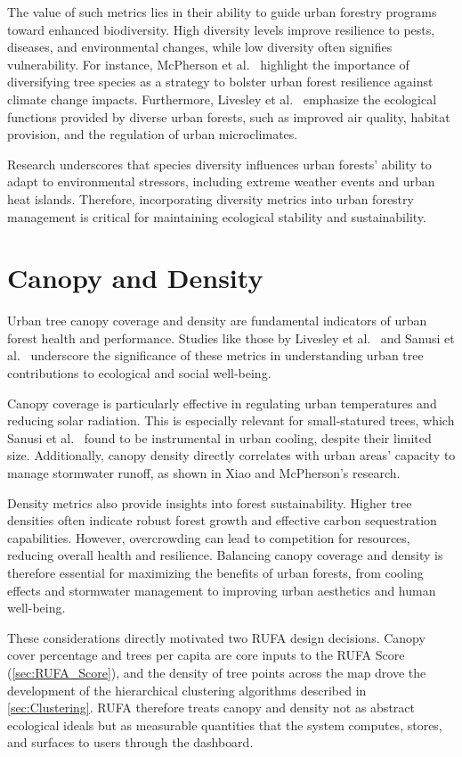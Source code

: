 The value of such metrics lies in their ability to guide urban forestry programs toward enhanced biodiversity. High diversity levels improve resilience to pests, diseases, and environmental changes, while low diversity often signifies vulnerability. For instance, McPherson et al.\ \cite{mcpherson2018} highlight the importance of diversifying tree species as a strategy to bolster urban forest resilience against climate change impacts. Furthermore, Livesley et al.\ \cite{livesley2016} emphasize the ecological functions provided by diverse urban forests, such as improved air quality, habitat provision, and the regulation of urban microclimates.

Research underscores that species diversity influences urban forests' ability to adapt to environmental stressors, including extreme weather events and urban heat islands. Therefore, incorporating diversity metrics into urban forestry management is critical for maintaining ecological stability and sustainability.

\section{Canopy and Density} \label{sec:Canopy_Density}

Urban tree canopy coverage and density are fundamental indicators of urban forest health and performance. Studies like those by Livesley et al.\ \cite{livesley2016} and Sanusi et al.\ \cite{sanusi2016} underscore the significance of these metrics in understanding urban tree contributions to ecological and social well-being.

Canopy coverage is particularly effective in regulating urban temperatures and reducing solar radiation. This is especially relevant for small-statured trees, which Sanusi et al.\ \cite{sanusi2016} found to be instrumental in urban cooling, despite their limited size. Additionally, canopy density directly correlates with urban areas' capacity to manage stormwater runoff, as shown in Xiao and McPherson's \cite{xiao2016} research.

Density metrics also provide insights into forest sustainability. Higher tree densities often indicate robust forest growth and effective carbon sequestration capabilities. However, overcrowding can lead to competition for resources, reducing overall health and resilience. Balancing canopy coverage and density is therefore essential for maximizing the benefits of urban forests, from cooling effects and stormwater management to improving urban aesthetics and human well-being.

These considerations directly motivated two RUFA design decisions. Canopy cover percentage and trees per capita are core inputs to the RUFA Score (\autoref{sec:RUFA_Score}), and the density of tree points across the map drove the development of the hierarchical clustering algorithms described in \autoref{sec:Clustering}. RUFA therefore treats canopy and density not as abstract ecological ideals but as measurable quantities that the system computes, stores, and surfaces to users through the dashboard.
